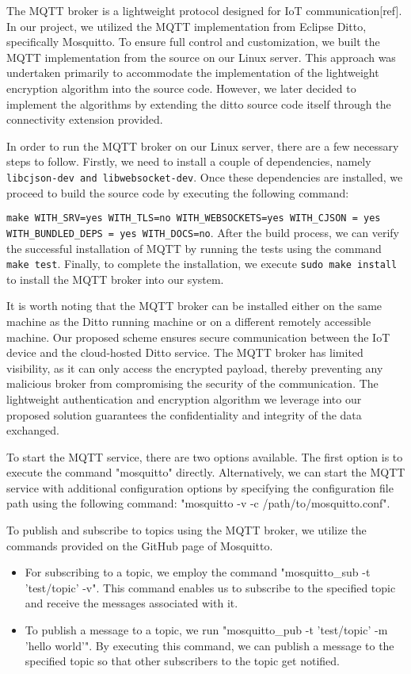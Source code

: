 The MQTT broker is a lightweight protocol designed for IoT communication[ref]. In our project, we utilized the MQTT implementation from Eclipse Ditto, specifically Mosquitto. To ensure full control and customization, we built the MQTT implementation from the source on our Linux server. This approach was undertaken primarily to accommodate the implementation of the lightweight encryption algorithm into the source code. However, we later decided to implement the algorithms by extending the ditto source code itself through the connectivity extension provided. 

In order to run the MQTT broker on our Linux server, there are a few necessary steps to follow. Firstly, we need to install a couple of dependencies, namely \texttt{libcjson-dev and libwebsocket-dev}. Once these dependencies are installed, we proceed to build the source code by executing the following command: 

\texttt{make WITH\_SRV=yes WITH\_TLS=no WITH\_WEBSOCKETS=yes WITH\_CJSON = yes WITH\_BUNDLED\_DEPS = yes WITH\_DOCS=no}. After the build process, we can verify the successful installation of MQTT by running the tests using the command \texttt{make test}. Finally, to complete the installation, we execute \texttt{sudo make install} to install the MQTT broker into our system. 


It is worth noting that the MQTT broker can be installed either on the same machine as the Ditto running machine or on a different remotely accessible machine. Our proposed scheme ensures secure communication between the IoT device and the cloud-hosted Ditto service. The MQTT broker has limited visibility, as it can only access the encrypted payload, thereby preventing any malicious broker from compromising the security of the communication. The lightweight authentication and encryption algorithm we leverage into our proposed solution guarantees the confidentiality and integrity of the data exchanged.

To start the MQTT service, there are two options available. The first option is to execute the command "mosquitto" directly. Alternatively, we can start the MQTT service with additional configuration options by specifying the configuration file path using the following command: "mosquitto -v -c /path/to/mosquitto.conf".

To publish and subscribe to topics using the MQTT broker, we utilize the commands provided on the GitHub page of Mosquitto. 
    \begin{itemize}
        \item For subscribing to a topic, we employ the command "mosquitto\_sub -t 'test/topic' -v". This command enables us to subscribe to the specified topic and receive the messages associated with it. 
        \item To publish a message to a topic, we run "mosquitto\_pub -t 'test/topic' -m 'hello world'". By executing this command, we can publish a message to the specified topic so that other subscribers to the topic get notified. 
    \end{itemize}
    
    
